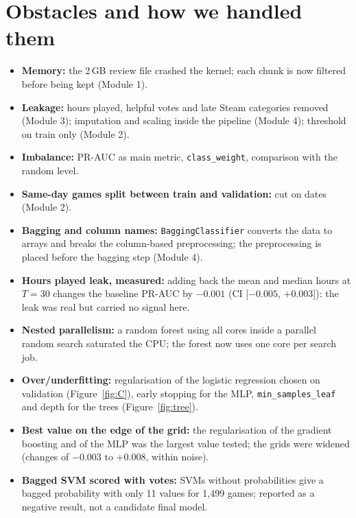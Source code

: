 \documentclass[11pt,a4paper]{article}
\newcommand{\code}[1]{\texttt{#1}}
\begin{document}
\section{Obstacles and how we handled them}
\begin{itemize}
  \item \textbf{Memory:} the 2\,GB review file crashed the kernel; each chunk is now filtered before
        being kept (Module 1).
  \item \textbf{Leakage:} hours played, helpful votes and late Steam categories removed (Module 3);
        imputation and scaling inside the pipeline (Module 4); threshold on train only (Module 2).
  \item \textbf{Imbalance:} PR-AUC as main metric, \code{class\_weight}, comparison with the random level.
  \item \textbf{Same-day games split between train and validation:} cut on dates (Module 2).
  \item \textbf{Bagging and column names:} \code{BaggingClassifier} converts the data to arrays and breaks the
        column-based preprocessing; the preprocessing is placed before the bagging step (Module 4).
  \item \textbf{Hours played leak, measured:} adding back the mean and median hours at $T = 30$ changes the
        baseline PR-AUC by $-0.001$ (CI [$-0.005$, $+0.003$]): the leak was real but carried no signal here.
  \item \textbf{Nested parallelism:} a random forest using all cores inside a parallel random search
        saturated the CPU; the forest now uses one core per search job.
  \item \textbf{Over/underfitting:} regularisation of the logistic regression chosen on validation
        (Figure~\ref{fig:C}), early stopping for the MLP, \code{min\_samples\_leaf} and depth for the trees
        (Figure~\ref{fig:tree}).
  \item \textbf{Best value on the edge of the grid:} the regularisation of the gradient boosting and of the
        MLP was the largest value tested; the grids were widened (changes of $-0.003$ to $+0.008$, within noise).
  \item \textbf{Bagged SVM scored with votes:} SVMs without probabilities give a bagged probability with
        only 11 values for 1{,}499 games; reported as a negative result, not a candidate final model.
\end{itemize}
\end{document}
